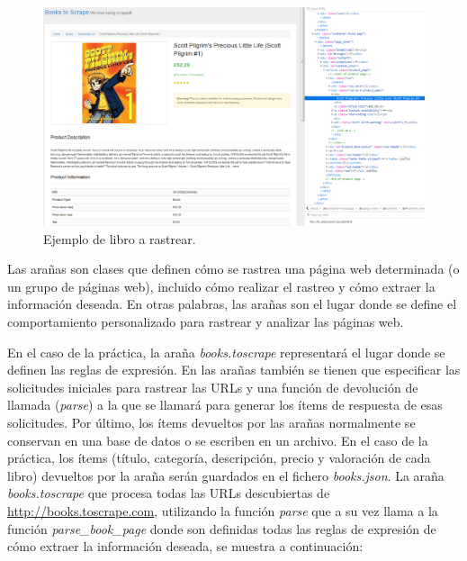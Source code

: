 \documentclass{uimppracticas}
\begin{document}
\begin{figure}[h]
	\centering
	\includegraphics[scale=0.33]{images/book}
	\caption{Ejemplo de libro a rastrear.}
	\label{book}
\end{figure}

\begin{definition}\label{spider}
Las arañas son clases que definen cómo se rastrea una página web determinada (o un grupo de páginas web), incluido cómo realizar el rastreo y cómo extraer la información deseada. En otras palabras, las arañas son el lugar donde se define el comportamiento personalizado para rastrear y analizar las páginas web.
\end{definition}

En el caso de la práctica, la araña \textit{books.toscrape} representará el lugar donde se definen las reglas de expresión. En las arañas también se tienen que especificar las solicitudes iniciales para rastrear las URLs y una función de devolución de llamada (\textit{parse}) a la que se llamará para generar los ítems de respuesta de esas solicitudes. Por último, los ítems devueltos por las arañas normalmente se conservan en una base de datos o se escriben en un archivo. En el caso de la práctica, los ítems (título, categoría, descripción, precio y valoración de cada libro) devueltos por la araña serán guardados en el fichero \textit{books.json}. La araña \textit{books.toscrape} que procesa todas las URLs descubiertas de \url{http://books.toscrape.com}, utilizando la función \textit{parse} que a su vez llama a la función \textit{parse\_book\_page} donde son definidas todas las reglas de expresión de cómo extraer la información deseada, se muestra a continuación:
\end{document}
